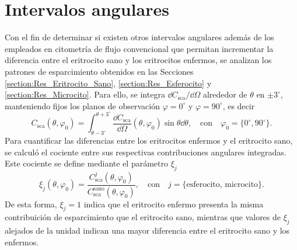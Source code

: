 
\section{Intervalos angulares}
\label{section:angle_interval}
\vspace{-0.2cm}

Con el fin de determinar si existen otros intervalos angulares además de los empleados en citometría de flujo convencional que permitan incrementar la diferencia entre el eritrocito sano y los eritrocitos enfermos, se analizan los patrones de esparcimiento obtenidos en las Secciones \ref{section:Res_Eritrocito_Sano}, \ref{section:Res_Esferocito} y \ref{section:Res_Microcito}. Para ello, se integra $\dd{C_{\text{sca}}}/\dd{\Omega}$  alrededor de $\theta$ en $\pm 3^{\circ}$, manteniendo fijos los planos de observación $\varphi=0^\circ$ y $\varphi=90^\circ$, es decir
%
\begin{equation}
	C_{\text{sca}}(\theta,\varphi_0)=\int_{\theta-3^{\circ}}^{\theta+3^{\circ}}\dfrac{\dd{C_{\text{sca}}}}{\dd{\Omega}}(\theta,\varphi_0)\sin\theta\dd{\theta},\quad \text{con}\quad \varphi_0=\{0^{\circ},90^{\circ}\}.
\end{equation}
%
Para cuantificar las diferencias entre los eritrocitos enfermos y el eritrocito sano, se calculó el cociente entre sus respectivas contribuciones angulares integradas. Este cociente se define mediante el parámetro $\xi_j$
%
\begin{equation}
	\xi_j(\theta,\varphi_0)=\dfrac{C_{\text{sca}}^j(\theta,\varphi_0)}{	C_{\text{sca}}^{\text{sano}}(\theta,\varphi_0)},\quad \text{con}\quad j=\{\text{esferocito, microcito}\}.
	\label{eq:parametro_xi}
\end{equation}
De esta forma, $\xi_j=1$ indica que el eritrocito enfermo presenta la misma contribuición de esparcimiento que el eritrocito sano, mientras que valores de $\xi_j$ alejados de la unidad indican una mayor diferencia entre el eritrocito sano y los enfermos. 

